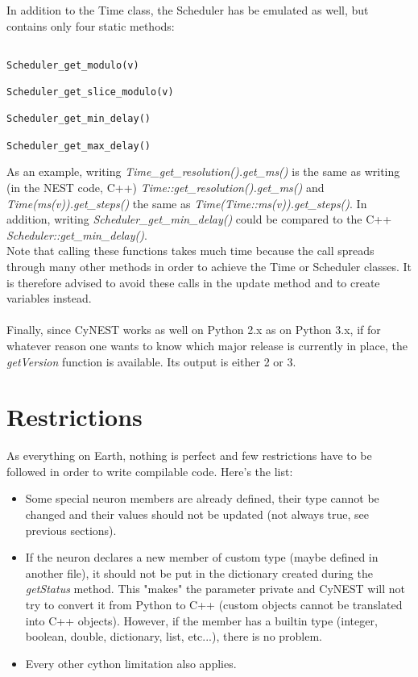\documentclass{article}
\begin{document}
In addition to the Time class, the Scheduler has be emulated as well, but contains only four static methods:
\begin{verbatim}

Scheduler_get_modulo(v)

Scheduler_get_slice_modulo(v)

Scheduler_get_min_delay()

Scheduler_get_max_delay()

\end{verbatim}

As an example, writing \emph{Time\_get\_resolution().get\_ms()} is the same as writing (in the NEST code, C++) \emph{Time::get\_resolution().get\_ms()} and \\ \emph{Time(ms(v)).get\_steps()} the same as \emph{Time(Time::ms(v)).get\_steps()}. In addition, writing \emph{Scheduler\_get\_min\_delay()} could be compared to the C++ \emph{Scheduler::get\_min\_delay()}.\\
Note that calling these functions takes much time because the call spreads through many other methods in order to achieve the Time or Scheduler classes. It is therefore advised to avoid these calls in the update method and to create variables instead. \\ \\
Finally, since CyNEST works as well on Python 2.x as on Python 3.x, if for whatever reason one wants to know which major release is currently in place, the \emph{getVersion} function is available. Its output is either 2 or 3.


\section{Restrictions}
As everything on Earth, nothing is perfect and few restrictions have to be followed in order to write compilable code. Here's the list:
\begin{itemize}
\item Some special neuron members are already defined, their type cannot be changed and their values should not be updated (not always true, see previous sections).
\item If the neuron declares a new member of custom type (maybe defined in another file), it should not be put in the dictionary created during the \emph{getStatus} method. This "makes" the parameter private and CyNEST will not try to convert it from Python to C++ (custom objects cannot be translated into C++ objects). However, if the member has a builtin type (integer, boolean, double, dictionary, list, etc...), there is no problem.
\item Every other cython limitation also applies.
\end{itemize}
\end{document}
